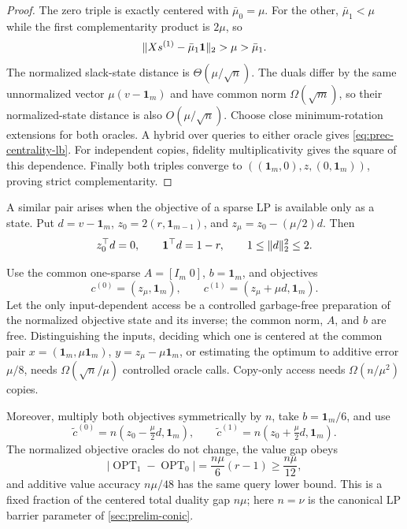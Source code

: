 \begin{proof}
The zero triple is exactly centered with $\bar\mu_0=\mu$.  For the other,
$\bar\mu_1<\mu$ while the first complementarity product is $2\mu$, so
\begin{equation}
 \lVert Xs^{(1)}-\bar\mu_1\mathbf1\rVert_2>\mu>\bar\mu_1.       \label{eq:prec-central-gap}
\end{equation}
The normalized slack-state distance is $\Theta(\mu/\sqrt n)$.  The duals
differ by the same unnormalized vector $\mu(v-\mathbf1_m)$ and have common
norm $\Omega(\sqrt m)$, so their normalized-state distance is also
$O(\mu/\sqrt n)$.  Choose close minimum-rotation extensions for both
oracles.  A hybrid over queries to either oracle gives
\eqref{eq:prec-centrality-lb}.  For independent copies, fidelity
multiplicativity gives the square of this dependence.  Finally both triples
converge to
$((\mathbf1_m,0),z,(0,\mathbf1_m))$, proving strict complementarity.
\end{proof}

A similar pair arises when the objective of a sparse LP is available only as
a state.  Put $d=v-\mathbf1_m$,
$z_0=2(r,\mathbf1_{m-1})$, and $z_\mu=z_0-(\mu/2)d$.  Then
\begin{equation}
 z_0^\top d=0,\qquad \mathbf1^\top d=1-r,\qquad 1\leq\lVert d\rVert_2^2\leq2.
 \label{eq:prec-input-identities}
\end{equation}
\begin{theorem}
\label{thm:prec-input-generated}
Use the common one-sparse $A=[I_m\;0]$, $b=\mathbf1_m$, and objectives
\begin{equation}
 c^{(0)}=(z_\mu,\mathbf1_m),\qquad
 c^{(1)}=(z_\mu+\mu d,\mathbf1_m).                       \label{eq:prec-input-objectives}
\end{equation}
Let the only input-dependent access be a controlled garbage-free preparation
of the normalized objective state and its inverse; the common norm, $A$, and $b$ are free.
Distinguishing the inputs, deciding which one is centered at the common pair
$x=(\mathbf1_m,\mu\mathbf1_m)$,
$y=z_\mu-\mu\mathbf1_m$, or estimating the optimum to additive error
$\mu/8$, needs $\Omega(\sqrt n/\mu)$ controlled oracle calls.  Copy-only
access needs $\Omega(n/\mu^2)$ copies.

Moreover, multiply both objectives symmetrically by $n$, take
$b=\mathbf1_m/6$, and use
\[
 \widetilde c^{(0)}=n(z_0-\tfrac\mu2d,\mathbf1_m),\qquad
 \widetilde c^{(1)}=n(z_0+\tfrac\mu2d,\mathbf1_m).
\]
The normalized objective oracles do not change, the value gap obeys
\begin{equation}
 |\operatorname{OPT}_1-\operatorname{OPT}_0|
 =\frac{n\mu}{6}(r-1)\geq\frac{n\mu}{12},                \label{eq:prec-value-gap}
\end{equation}
and additive value accuracy $n\mu/48$ has the same query lower bound.  This
is a fixed fraction of the centered total duality gap $n\mu$; here
$n=\nu$ is the canonical LP barrier parameter of \cref{sec:prelim-conic}.
\end{theorem}

